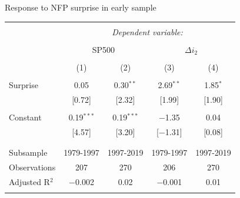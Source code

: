 \documentclass{beamer}
\begin{document}
\begin{frame}{Response to NFP surprise in early sample}
\begin{table}[!htbp] \centering 
\begin{tabular}{@{\extracolsep{5pt}}lcccc} 
\\[-1.8ex]\hline 
\hline \\[-1.8ex] 
 & \multicolumn{4}{c}{\textit{Dependent variable:}} \\ 
\cline{2-5} 
\\[-1.8ex] & \multicolumn{2}{c}{SP500} & \multicolumn{2}{c}{$\Delta i_2$} \\ 
\\[-1.8ex] & (1) & (2) & (3) & (4)\\ 
\hline \\[-1.8ex] 
 Surprise & 0.05 & 0.30$^{**}$ & 2.69$^{**}$ & 1.85$^{*}$ \\ 
  & [0.72] & [2.32] & [1.99] & [1.90] \\ 
  & & & & \\ 
 Constant & 0.19$^{***}$ & 0.19$^{***}$ & $-$1.35 & 0.04 \\ 
  & [4.57] & [3.20] & [$-$1.31] & [0.08] \\ 
  & & & & \\ 
\hline \\[-1.8ex] 
Subsample & 1979-1997 & 1997-2019 & 1979-1997 & 1997-2019 \\ 
Observations & 207 & 270 & 206 & 270 \\ 
Adjusted R$^{2}$ & $-$0.002 & 0.02 & $-$0.001 & 0.01 \\ 
\hline 
\hline \\[-1.8ex] 
\end{tabular} 
\end{table}
\end{frame}



\normalsize
\end{document}
